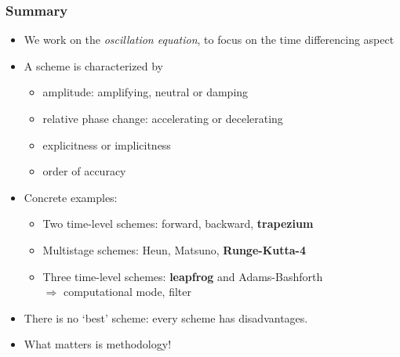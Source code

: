 \documentclass[aspectratio=149,9pt]{beamer}
\begin{document}
%
\begin{frame}
	\frametitle{Summary}
	\begin{itemize}
		\item We work on the \emph{oscillation equation}, to focus on the time differencing aspect\vspace*{3ex}
		\item A scheme is characterized by
			\begin{itemize}
				\item amplitude: amplifying, neutral or damping
				\item relative phase change: accelerating or decelerating
				\item explicitness or implicitness
				\item order of accuracy\vspace*{3ex}
			\end{itemize}
		\item Concrete examples:
			\begin{itemize}
				\item Two time-level schemes: forward, backward, \textbf{trapezium}
				\item Multistage schemes: Heun, Matsuno, \textbf{Runge-Kutta-4}
				\item Three time-level schemes: \textbf{leapfrog} and Adams-Bashforth\\
					{\hspace*{5mm}$\Rightarrow$ computational mode, filter}\vspace*{3ex}
			\end{itemize}
		\item There is no `best' scheme: every scheme has disadvantages.\vspace*{3ex}
		\item What matters is methodology!
	\end{itemize}
\end{frame}
%
%
\end{document}
